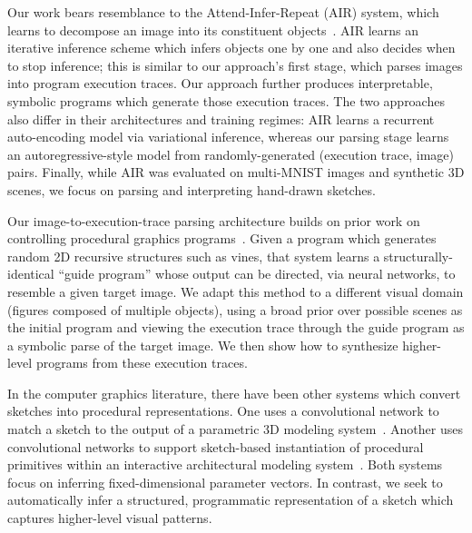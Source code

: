 \documentclass{article}
\begin{document}
Our work bears resemblance to the Attend-Infer-Repeat (AIR) system, which learns to decompose an image into its constituent objects~\cite{eslami1603attend}. AIR learns an iterative inference scheme which infers objects one by one and also decides when to stop inference; this is similar to our approach's first stage, which parses images into program execution traces. Our approach further produces interpretable, symbolic programs which generate those execution traces. The two approaches also differ in their architectures and training regimes: AIR learns a recurrent auto-encoding model via variational inference, whereas our parsing stage learns an autoregressive-style model from randomly-generated (execution trace, image) pairs. Finally, while AIR was evaluated on multi-MNIST images and synthetic 3D scenes, we focus on parsing and interpreting hand-drawn sketches.

Our image-to-execution-trace parsing architecture builds on prior work on controlling procedural graphics programs~\cite{ritchie2016neurally}. Given a program which generates random 2D recursive structures such as vines, that system learns a structurally-identical ``guide program'' whose output can be directed, via neural networks, to resemble a given target image. 
We adapt this method to a different visual domain (figures composed of multiple objects), using a broad prior over possible scenes as the initial program and viewing the execution trace through the guide program as a symbolic parse of the target image.
We then show how to synthesize higher-level programs from these execution traces.

In the computer graphics literature, there have been other systems which convert sketches into procedural representations. One uses a convolutional network to match a sketch to the output of a parametric 3D modeling system~\cite{huang2017shape}. Another uses convolutional networks to support sketch-based instantiation of procedural primitives within an interactive architectural modeling system~\cite{Nishida:2016:ISU:2897824.2925951}. Both systems focus on inferring fixed-dimensional parameter vectors. In contrast, we seek to automatically infer a structured, programmatic representation of a sketch which captures higher-level visual patterns.
\end{document}
